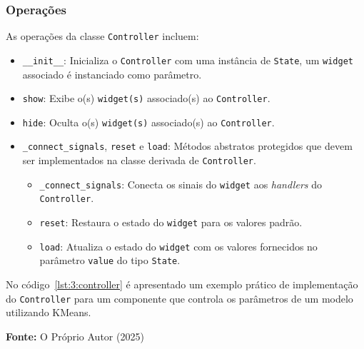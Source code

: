 \subsubsection{Operações}
\label{subsec:3.3.2:operations}

As operações da classe \texttt{Controller} incluem:

\begin{itemize}
    \item \texttt{\_\_init\_\_}: Inicializa o \texttt{Controller} com uma instância de \texttt{State}, um \texttt{widget} associado é instanciado como parâmetro.

    \item \texttt{show}: Exibe o(s) \texttt{widget(s)} associado(s) ao \texttt{Controller}.

    \item \texttt{hide}: Oculta o(s) \texttt{widget(s)} associado(s) ao \texttt{Controller}.

    \item \texttt{\_connect\_signals}, \texttt{reset} e \texttt{load}: Métodos abstratos protegidos que devem ser implementados na classe derivada de \texttt{Controller}.

    \begin{itemize}
        \item \texttt{\_connect\_signals}: Conecta os sinais do \texttt{widget} aos \textit{handlers} do \texttt{Controller}.

        \item \texttt{reset}: Restaura o estado do \texttt{widget} para os valores padrão.

        \item \texttt{load}: Atualiza o estado do \texttt{widget} com os valores fornecidos no parâmetro \texttt{value} do tipo \texttt{State}.
    \end{itemize}
\end{itemize}

No código~\ref{lst:3:controller} é apresentado um exemplo prático de implementação do \texttt{Controller} para um componente que controla os parâmetros de um modelo utilizando KMeans.

\hfill \break

\begin{center}
    
    \centerline{\textbf{Fonte:} O Próprio Autor (2025)}
\end{center}


